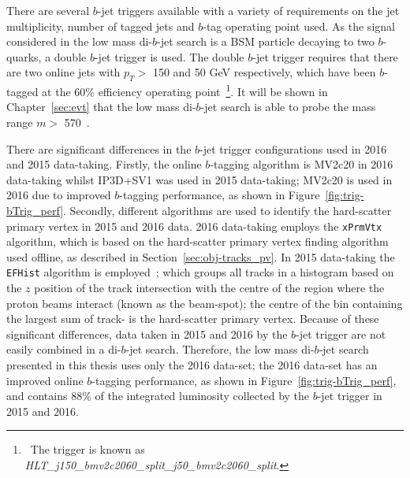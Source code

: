 There are several $b$-jet triggers available
with a variety of requirements on the jet multiplicity, number of tagged jets and $b$-tag operating point used.
As the signal considered in the low mass di-$b$-jet search is a BSM particle decaying to two $b$-quarks, a double $b$-jet trigger is used.
The double $b$-jet trigger requires that there are two online jets with $p_T >$ 150 and 50 GeV respectively,
which have been $b$-tagged at the 60\% efficiency operating point~\footnote{\ The trigger is known as \textit{HLT\_j150\_bmv2c2060\_split\_j50\_bmv2c2060\_split}.}.
It will be shown in Chapter~\ref{sec:evt} that the low mass di-$b$-jet search is able to probe the mass range $m >$ 570~\GeV.

There are significant differences in the  $b$-jet trigger configurations used in 2016 and 2015 data-taking.
Firstly, the online $b$-tagging algorithm is MV2c20 in 2016 data-taking whilst IP3D+SV1 was used in 2015 data-taking;
MV2c20 is used in 2016 due to improved $b$-tagging performance, as shown in Figure~\ref{fig:trig-bTrig_perf}.
Secondly, different algorithms are used to identify the hard-scatter primary vertex in 2015 and 2016 data.
2016 data-taking employs the \verb|xPrmVtx| algorithm, which is based on the hard-scatter primary vertex finding algorithm used offline, as described in Section~\ref{sec:obj-tracks_pv}.
In 2015 data-taking the \verb|EFHist| algorithm is employed~\cite{trig-EFHist};
which groups all tracks in a histogram based on the $z$ position of the track intersection with the centre of the region where the proton beams interact (known as the beam-spot);
the centre of the bin containing the largest sum of track-\pT{} is the hard-scatter primary vertex.
Because of these significant differences, data taken in 2015 and 2016 by the $b$-jet trigger are not easily combined in a di-$b$-jet search.
Therefore, the low mass di-$b$-jet search presented in this thesis uses only the 2016 data-set;
the 2016 data-set has an improved online $b$-tagging performance, as shown in Figure~\ref{fig:trig-bTrig_perf},
and contains 88\% of the integrated luminosity collected by the $b$-jet trigger in 2015 and 2016.

